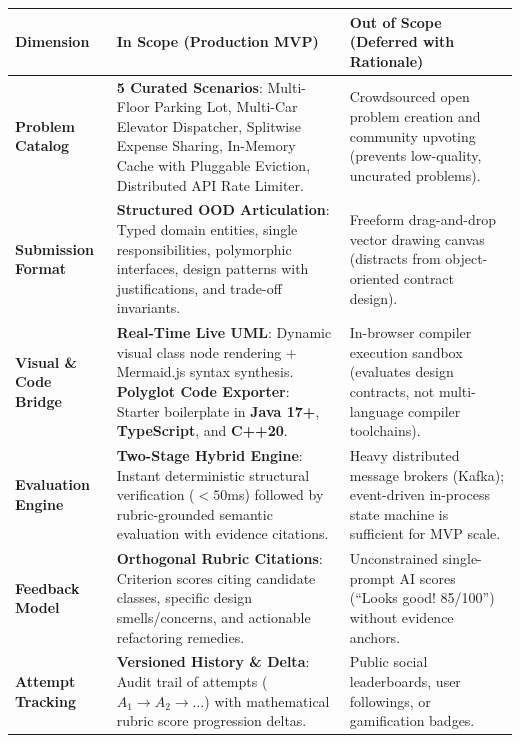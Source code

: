 \documentclass[10pt,a4paper]{article}
\begin{document}
\begin{table}[h!]
\small
\centering
\begin{tabularx}{\textwidth}{l p{5.5cm} X}
\toprule
\textbf{Dimension} & \textbf{In Scope (Production MVP)} & \textbf{Out of Scope (Deferred with Rationale)} \\
\midrule
\textbf{Problem Catalog} & \textbf{5 Curated Scenarios}: Multi-Floor Parking Lot, Multi-Car Elevator Dispatcher, Splitwise Expense Sharing, In-Memory Cache with Pluggable Eviction, Distributed API Rate Limiter. & Crowdsourced open problem creation and community upvoting (prevents low-quality, uncurated problems). \\
\addlinespace[3pt]
\textbf{Submission Format} & \textbf{Structured OOD Articulation}: Typed domain entities, single responsibilities, polymorphic interfaces, design patterns with justifications, and trade-off invariants. & Freeform drag-and-drop vector drawing canvas (distracts from object-oriented contract design). \\
\addlinespace[3pt]
\textbf{Visual \& Code Bridge} & \textbf{Real-Time Live UML}: Dynamic visual class node rendering + Mermaid.js syntax synthesis. \newline \textbf{Polyglot Code Exporter}: Starter boilerplate in \textbf{Java 17+}, \textbf{TypeScript}, and \textbf{C++20}. & In-browser compiler execution sandbox (evaluates design contracts, not multi-language compiler toolchains). \\
\addlinespace[3pt]
\textbf{Evaluation Engine} & \textbf{Two-Stage Hybrid Engine}: Instant deterministic structural verification ($<50$ms) followed by rubric-grounded semantic evaluation with evidence citations. & Heavy distributed message brokers (Kafka); event-driven in-process state machine is sufficient for MVP scale. \\
\addlinespace[3pt]
\textbf{Feedback Model} & \textbf{Orthogonal Rubric Citations}: Criterion scores citing candidate classes, specific design smells/concerns, and actionable refactoring remedies. & Unconstrained single-prompt AI scores (``Looks good! 85/100'') without evidence anchors. \\
\addlinespace[3pt]
\textbf{Attempt Tracking} & \textbf{Versioned History \& Delta}: Audit trail of attempts ($A_1 \rightarrow A_2 \rightarrow \dots$) with mathematical rubric score progression deltas. & Public social leaderboards, user followings, or gamification badges. \\
\bottomrule
\end{tabularx}
\end{table}
\end{document}
